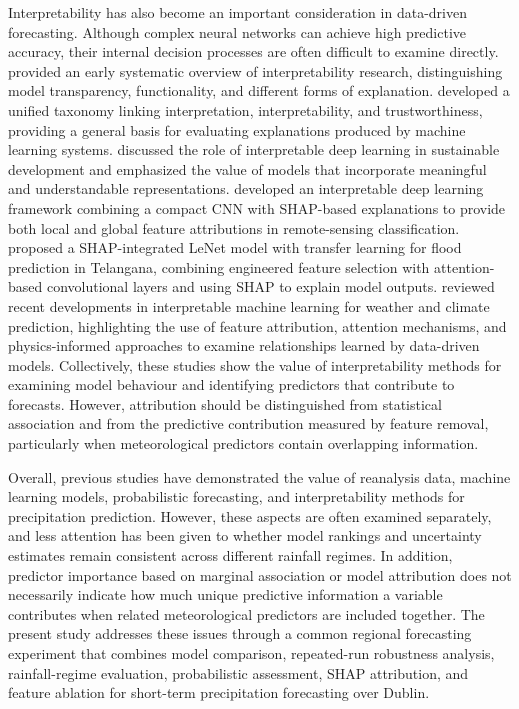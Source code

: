 \documentclass[referee,pdflatex,sn-basic]{sn-jnl}%
\theoremstyle{thmstyleone}%
\theoremstyle{thmstyletwo}%
\theoremstyle{thmstylethree}%
\begin{document}
Interpretability has also become an important consideration in data-driven forecasting. Although complex neural networks can achieve high predictive accuracy, their internal decision processes are often difficult to examine directly. \citet{chakraborty2017interpretability} provided an early systematic overview of interpretability research, distinguishing model transparency, functionality, and different forms of explanation. \citet{li2022interpretable} developed a unified taxonomy linking interpretation, interpretability, and trustworthiness, providing a general basis for evaluating explanations produced by machine learning systems. \citet{vinuesa2021interpretable} discussed the role of interpretable deep learning in sustainable development and emphasized the value of models that incorporate meaningful and understandable representations. \citet{temenos2023interpretable} developed an interpretable deep learning framework combining a compact CNN with SHAP-based explanations to provide both local and global feature attributions in remote-sensing classification. \citet{yoganand2026shap} proposed a SHAP-integrated LeNet model with transfer learning for flood prediction in Telangana, combining engineered feature selection with attention-based convolutional layers and using SHAP to explain model outputs. \citet{yang2024interpretable} reviewed recent developments in interpretable machine learning for weather and climate prediction, highlighting the use of feature attribution, attention mechanisms, and physics-informed approaches to examine relationships learned by data-driven models. Collectively, these studies show the value of interpretability methods for examining model behaviour and identifying predictors that contribute to forecasts. However, attribution should be distinguished from statistical association and from the predictive contribution measured by feature removal, particularly when meteorological predictors contain overlapping information.

Overall, previous studies have demonstrated the value of reanalysis data, machine learning models, probabilistic forecasting, and interpretability methods for precipitation prediction. However, these aspects are often examined separately, and less attention has been given to whether model rankings and uncertainty estimates remain consistent across different rainfall regimes. In addition, predictor importance based on marginal association or model attribution does not necessarily indicate how much unique predictive information a variable contributes when related meteorological predictors are included together. The present study addresses these issues through a common regional forecasting experiment that combines model comparison, repeated-run robustness analysis, rainfall-regime evaluation, probabilistic assessment, SHAP attribution, and feature ablation for short-term precipitation forecasting over Dublin.
\end{document}
